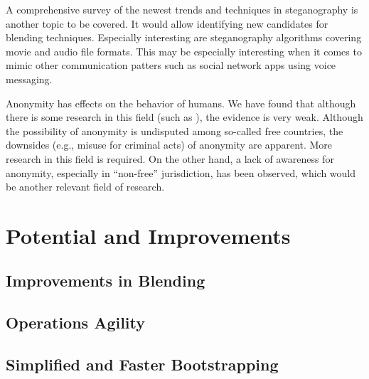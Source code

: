 A comprehensive survey of the newest trends and techniques in steganography is another topic to be covered. It would allow identifying new candidates for blending techniques. Especially interesting are steganography algorithms covering movie and audio file formats. This may be especially interesting when it comes to mimic other communication patters such as social network apps using voice messaging.

Anonymity has effects on the behavior of humans. We have found that although there is some research in this field (such as \cite{postmes2001social}), the evidence is very weak. Although the possibility of anonymity is undisputed among so-called free countries, the downsides (e.g., misuse for criminal acts) of anonymity are apparent. More research in this field is required. On the other hand, a lack of awareness for anonymity, especially in ``non-free'' jurisdiction, has been observed, which would be another relevant field of research. 

\chapter{Potential and Improvements}
\section{Improvements in Blending}
\newpage

\section{Operations Agility}
\section{Simplified and Faster Bootstrapping}